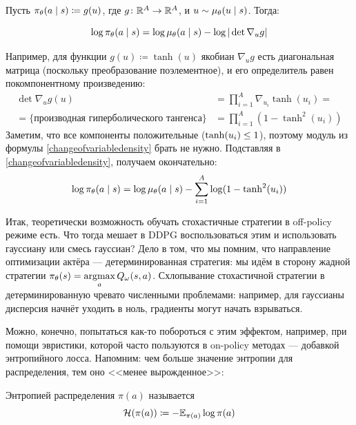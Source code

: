 \begin{theorem}
Пусть $\pi_\theta(a \HM \mid s) \coloneqq g(u)$, где $g \colon \mathbb{R}^A \to \mathbb{R}^A$, и $u \HM \sim \mu_\theta(u \HM \mid s)$. Тогда:

\begin{equation}\label{changeofvariabledensity}
\log \pi_\theta(a \HM \mid s) = \log \mu_\theta(a \HM \mid s) - \log | \det \nabla_u g | 
\end{equation}
\end{theorem}

\begin{example}
Например, для функции $g(u) \coloneqq \tanh (u)$ якобиан $\nabla_u g$ есть диагональная матрица (поскольку преобразование поэлементное), и его определитель равен покомпонентному произведению:
\begin{align*}
\det \nabla_u g(u) &= \prod_{i=1}^{A} \nabla_{u_i} \tanh(u_i) = \\
= \{ \text{производная гиперболического тангенса} \} &= \prod_{i=1}^A (1 - \tanh^2(u_i))    
\end{align*}
Заметим, что все компоненты положительные ($\tanh(u_i) \HM \le 1$), поэтому модуль из формулы \eqref{changeofvariabledensity} брать не нужно. Подставляя в \eqref{changeofvariabledensity}, получаем окончательно:
$$\log \pi_\theta(a \HM \mid s) = \log \mu_\theta(a \HM \mid s) - \sum_{i=1}^A \log (1 - \tanh^2(u_i)) $$
\end{example}

Итак, теоретически возможность обучать стохастичные стратегии в off-policy режиме есть. Что тогда мешает в DDPG воспользоваться этим и использовать гауссиану или смесь гауссиан? Дело в том, что мы помним, что направление оптимизации актёра --- детерминированная стратегия: мы идём в сторону жадной стратегии $\pi_\theta(s) \HM= \argmax\limits_a Q_\omega(s, a)$. Схлопывание стохастичной стратегии в детерминированную чревато численными проблемами: например, для гауссианы дисперсия начнёт уходить в ноль, градиенты могут начать взрываться.

Можно, конечно, попытаться как-то побороться с этим эффектом, например, при помощи эвристики, которой часто пользуются в on-policy методах --- добавкой энтропийного лосса. Напомним: чем больше значение энтропии для распределения, тем оно <<менее вырожденное>>:

\begin{definition}
Энтропией распределения $\pi(a)$ называется
\begin{equation}\label{entropydef}
\mathcal{H}(\pi(a)) \coloneqq - \mathbb{E}_{\pi(a)} \log \pi(a)
\end{equation}
\end{definition}

